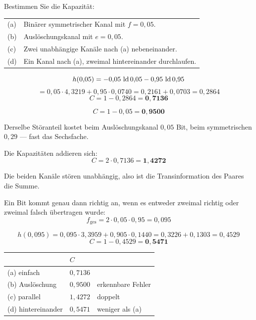 \begin{aufgabe}
Bestimmen Sie die Kapazität:
\begin{center}
{\small
\renewcommand{\arraystretch}{1.4}
\begin{tabular}{@{}P{0.8cm}P{7.6cm}@{}}
\toprule
(a) & Binärer symmetrischer Kanal mit $f=0{,}05$.\\
(b) & Auslöschungskanal mit $e=0{,}05$.\\
(c) & Zwei unabhängige Kanäle nach (a) nebeneinander.\\
(d) & Ein Kanal nach (a), zweimal hintereinander durchlaufen.\\
\bottomrule
\end{tabular}}
\end{center}

\loesung
{}
\[ h(0{,}05) = -0{,}05\,\operatorname{ld}0{,}05 - 0{,}95\,\operatorname{ld}0{,}95 \]
\[ = 0{,}05\cdot4{,}3219 + 0{,}95\cdot0{,}0740 = 0{,}2161+0{,}0703 = 0{,}2864 \]
\[ C = 1-0{,}2864 = \mathbf{0{,}7136} \]

\[ C = 1-0{,}05 = \mathbf{0{,}9500} \]

 Derselbe Störanteil kostet beim Auslöschungskanal $0{,}05$ Bit, beim symmetrischen $0{,}29$ --- fast das Sechsfache.

Die Kapazitäten addieren sich:
\[ C = 2\cdot0{,}7136 = \mathbf{1{,}4272} \]

 Die beiden Kanäle stören unabhängig, also ist die Transinformation des Paares die Summe.

Ein Bit kommt genau dann richtig an, wenn es entweder zweimal richtig oder zweimal falsch übertragen wurde:
\[ f_{\text{ges}} = 2\cdot0{,}05\cdot0{,}95 = 0{,}095 \]

\[ h(0{,}095) = 0{,}095\cdot3{,}3959 + 0{,}905\cdot0{,}1440 = 0{,}3226+0{,}1303 = 0{,}4529 \]
\[ C = 1-0{,}4529 = \mathbf{0{,}5471} \]

\begin{center}
{\small
\renewcommand{\arraystretch}{1.48}
\begin{tabular}{@{}P{2.4cm}P{2.2cm}P{3.0cm}@{}}
\toprule
& $C$ & \\
\midrule
(a) einfach & $0{,}7136$ & \\
(b) Auslöschung & $0{,}9500$ & \textcolor{gruen}{erkennbare Fehler}\\
(c) parallel & $1{,}4272$ & doppelt\\
(d) hintereinander & $0{,}5471$ & \textcolor{akzent}{weniger als (a)}\\
\bottomrule
\end{tabular}}
\end{center}


\end{aufgabe}
